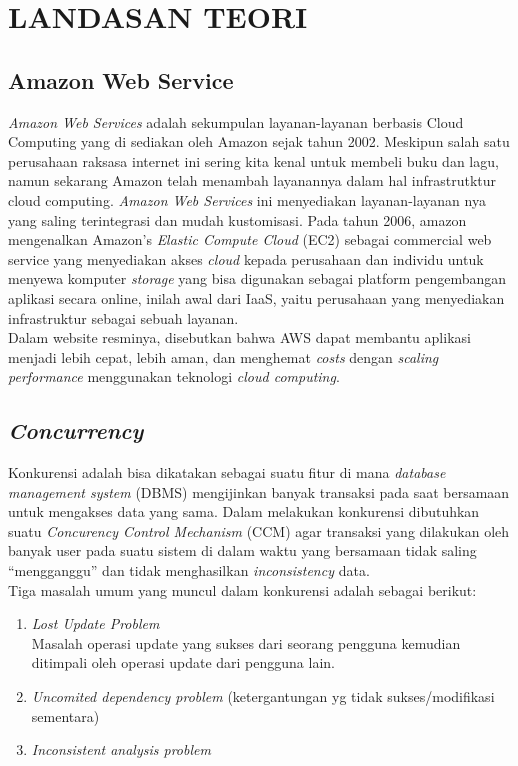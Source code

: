 	\chapter{LANDASAN TEORI}
	
	\section  {Amazon Web Service}
	\textit{Amazon Web Services }adalah sekumpulan layanan-layanan berbasis Cloud Computing yang di sediakan oleh Amazon sejak tahun 2002. Meskipun salah satu perusahaan raksasa internet ini sering kita kenal untuk membeli buku dan lagu, namun sekarang Amazon telah menambah layanannya dalam hal infrastrutktur cloud computing. \textit{Amazon Web Services} ini menyediakan layanan-layanan nya yang saling terintegrasi dan mudah kustomisasi. Pada tahun 2006, amazon mengenalkan Amazon’s \textit{Elastic Compute Cloud} (EC2) sebagai commercial web service yang menyediakan akses \textit{cloud} kepada perusahaan dan individu untuk menyewa komputer \textit{storage} yang bisa digunakan sebagai platform pengembangan aplikasi secara online, inilah awal dari IaaS, yaitu perusahaan yang menyediakan infrastruktur sebagai sebuah layanan\cite{wikipedia_amazon_2016}.
	\\ \indent
	Dalam website resminya, disebutkan bahwa AWS dapat membantu aplikasi menjadi lebih cepat, lebih aman, dan menghemat \textit{costs} dengan \textit{scaling} \textit{performance} menggunakan teknologi \textit{cloud computing}\cite{web_services_amazon_nodate}.
	
	\section{  \textit{Concurrency}}
	Konkurensi adalah bisa dikatakan sebagai suatu fitur di mana \textit{database management system} (DBMS) mengijinkan banyak transaksi pada saat bersamaan untuk mengakses data yang sama. Dalam melakukan konkurensi dibutuhkan suatu \textit{Concurency Control Mechanism }(CCM) agar transaksi yang dilakukan oleh banyak user pada suatu sistem di dalam waktu yang bersamaan tidak saling “mengganggu” dan tidak menghasilkan \textit{inconsistency} data.
	\\ \indent
	Tiga masalah umum yang muncul dalam konkurensi adalah sebagai berikut: 
	\begin{enumerate}
	    	\item \textit{Lost Update Problem }\\ \indent Masalah operasi update yang sukses dari seorang pengguna kemudian ditimpali oleh operasi update dari pengguna lain.
	    	\item\textit{ Uncomited dependency problem } (ketergantungan yg tidak sukses/modifikasi sementara)
	    	\item \textit{Inconsistent analysis problem} \cite{noauthor_sistem_2013}
	\end{enumerate}   
	
